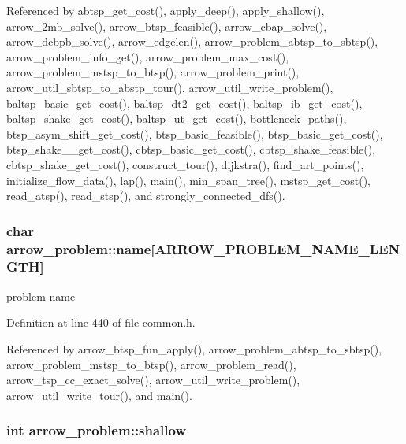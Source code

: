 Referenced by abtsp\_\-get\_\-cost(), apply\_\-deep(), apply\_\-shallow(), arrow\_\-2mb\_\-solve(), arrow\_\-btsp\_\-feasible(), arrow\_\-cbap\_\-solve(), arrow\_\-dcbpb\_\-solve(), arrow\_\-edgelen(), arrow\_\-problem\_\-abtsp\_\-to\_\-sbtsp(), arrow\_\-problem\_\-info\_\-get(), arrow\_\-problem\_\-max\_\-cost(), arrow\_\-problem\_\-mstsp\_\-to\_\-btsp(), arrow\_\-problem\_\-print(), arrow\_\-util\_\-sbtsp\_\-to\_\-abstp\_\-tour(), arrow\_\-util\_\-write\_\-problem(), baltsp\_\-basic\_\-get\_\-cost(), baltsp\_\-dt2\_\-get\_\-cost(), baltsp\_\-ib\_\-get\_\-cost(), baltsp\_\-shake\_\-get\_\-cost(), baltsp\_\-ut\_\-get\_\-cost(), bottleneck\_\-paths(), btsp\_\-asym\_\-shift\_\-get\_\-cost(), btsp\_\-basic\_\-feasible(), btsp\_\-basic\_\-get\_\-cost(), btsp\_\-shake\_\_\-get\_\-cost(), cbtsp\_\-basic\_\-get\_\-cost(), cbtsp\_\-shake\_\-feasible(), cbtsp\_\-shake\_\-get\_\-cost(), construct\_\-tour(), dijkstra(), find\_\-art\_\-points(), initialize\_\-flow\_\-data(), lap(), main(), min\_\-span\_\-tree(), mstsp\_\-get\_\-cost(), read\_\-atsp(), read\_\-stsp(), and strongly\_\-connected\_\-dfs().\hypertarget{structarrow__problem_8b7fec7ddd0462d3d841b87e287cff9f}{
\subsubsection[{name}]{\setlength{\rightskip}{0pt plus 5cm}char {\bf arrow\_\-problem::name}\mbox{[}ARROW\_\-PROBLEM\_\-NAME\_\-LENGTH\mbox{]}}}
\label{structarrow__problem_8b7fec7ddd0462d3d841b87e287cff9f}


problem name 

Definition at line 440 of file common.h.

Referenced by arrow\_\-btsp\_\-fun\_\-apply(), arrow\_\-problem\_\-abtsp\_\-to\_\-sbtsp(), arrow\_\-problem\_\-mstsp\_\-to\_\-btsp(), arrow\_\-problem\_\-read(), arrow\_\-tsp\_\-cc\_\-exact\_\-solve(), arrow\_\-util\_\-write\_\-problem(), arrow\_\-util\_\-write\_\-tour(), and main().\hypertarget{structarrow__problem_8c3f4f7794c1430440658d69151b296d}{
\subsubsection[{shallow}]{\setlength{\rightskip}{0pt plus 5cm}int {\bf arrow\_\-problem::shallow}}}
\label{structarrow__problem_8c3f4f7794c1430440658d69151b296d}


